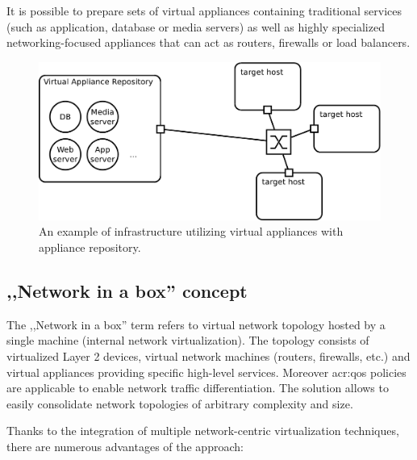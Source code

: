 \documentclass[11pt]{book}
\begin{document}
        It is possible to prepare sets of virtual appliances containing traditional services (such as application,
        database or media servers) as well as highly specialized networking-focused appliances that can act as routers,
        firewalls or load balancers.
        

        \begin{figure}[H]
          \begin{center}
            \includegraphics[width=.7\textwidth]{img/solaris/virtual-appliance-infra.pdf}
          \end{center}

          \caption{An example of infrastructure utilizing virtual appliances with appliance repository.}
        \end{figure}


      \subsection{,,Network in a box'' concept}

        The ,,Network in a box'' term refers to virtual network topology hosted by a single machine (internal network
        virtualization). The topology consists of virtualized Layer 2 devices, virtual network machines (routers,
        firewalls, etc.) and virtual appliances providing specific high-level services. Moreover \gls{acr:qos} policies
        are applicable to enable network traffic differentiation. The solution allows to easily consolidate network
        topologies of arbitrary complexity and size.

        Thanks to the integration of multiple network-centric virtualization techniques, there are numerous advantages
        of the approach:
\end{document}
